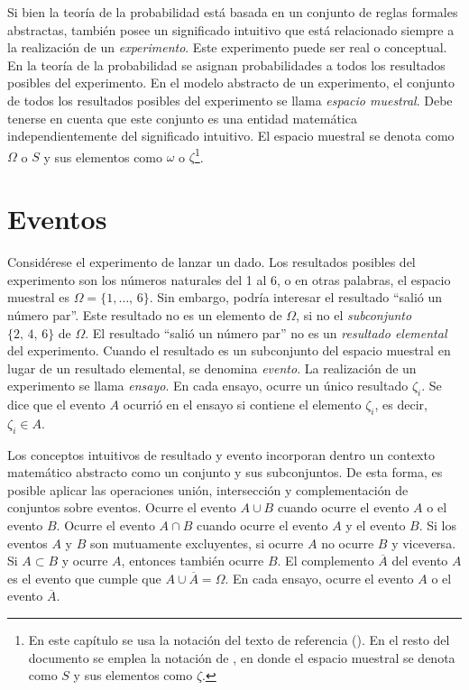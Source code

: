 \documentclass[a4paper]{report}
\begin{document}
Si bien la teoría de la probabilidad está basada en un conjunto de reglas formales abstractas, también posee un significado intuitivo que está relacionado siempre a la realización de un \emph{experimento}. Este experimento puede ser real o conceptual. En la teoría de la probabilidad se asignan probabilidades a todos los resultados posibles del experimento. En el modelo abstracto de un experimento, el conjunto de todos los resultados posibles del experimento se llama \emph{espacio muestral}. Debe tenerse en cuenta que este conjunto es una entidad matemática independientemente del significado intuitivo. El espacio muestral se denota como \(\Omega\)  o \(S\) y sus elementos como \(\omega\) o \(\zeta\)\footnote{En este capítulo se usa la notación del texto de referencia (\cite{kupferman09lectures}). En el resto del documento se emplea la notación de \cite{papoulis2002probability}, en donde el espacio muestral se denota como \(S\) y sus elementos como \(\zeta\).}.

\section{Eventos}

Considérese el experimento de lanzar un dado. Los resultados posibles del experimento son los números naturales del 1 al 6, o en otras palabras, el espacio muestral es \(\Omega=\{1,\dots,\,6\}\). Sin embargo, podría interesar el resultado ``salió un número par''. Este resultado no es un elemento de \(\Omega\), si no el \emph{subconjunto} \(\{2,\,4,\,6\}\) de \(\Omega\). El resultado ``salió un número par'' no es un \emph{resultado elemental} del experimento. Cuando el resultado es un subconjunto del espacio muestral en lugar de un resultado elemental, se denomina \emph{evento}.
La realización de un experimento se llama \emph{ensayo}. En cada ensayo, ocurre un único resultado \(\zeta_i\). Se dice que el evento \(A\) ocurrió en el ensayo si contiene el elemento \(\zeta_i\), es decir, \(\zeta_i\in A\).

Los conceptos intuitivos de resultado y evento incorporan dentro un contexto matemático abstracto como un conjunto y sus subconjuntos. De esta forma, es posible aplicar las operaciones unión, intersección y complementación de conjuntos sobre eventos. Ocurre el evento \(A\cup B\) cuando ocurre el evento \(A\) o el evento \(B\). Ocurre el evento \(A\cap B\) cuando ocurre el evento \(A\) y el evento \(B\). Si los eventos \(A\) y \(B\) son mutuamente excluyentes, si ocurre \(A\) no ocurre \(B\) y viceversa. Si \(A\subset B\) y ocurre \(A\), entonces también ocurre \(B\). El complemento \(\overline{A}\) del evento \(A\) es el evento que cumple que \(A\cup\overline{A}=\Omega\). En cada ensayo, ocurre el evento \(A\) o el evento \(\overline{A}\).
\end{document}

